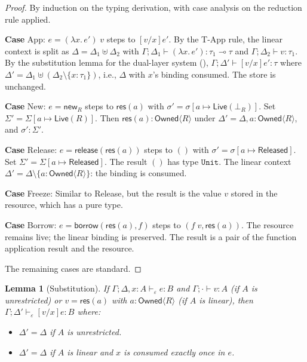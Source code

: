 \documentclass[11pt]{article}
\newtheorem{lemma}[theorem]{Lemma}
\newcommand{\Owned}[1]{\mathsf{Owned}\langle #1 \rangle}
\newcommand{\lolli}{\multimap}
\begin{document}
\begin{proof}
By induction on the typing derivation, with case analysis on the
reduction rule applied.

\textbf{Case} App: $e = (\lambda x.\, e')\; v$ steps to $[v/x]e'$.
By the T-App rule, the linear context is split as
$\Delta = \Delta_1 \uplus \Delta_2$ with
$\Gamma; \Delta_1 \vdash (\lambda x.\, e') : \tau_1 \lolli \tau$ and
$\Gamma; \Delta_2 \vdash v : \tau_1$.
By the substitution lemma for the dual-layer system (),
$\Gamma; \Delta' \vdash [v/x]e' : \tau$ where
$\Delta' = \Delta_1 \uplus (\Delta_2 \setminus \{x : \tau_1\})$,
i.e., $\Delta$ with $x$'s binding consumed.  The store is unchanged.

\textbf{Case} New: $e = \mathsf{new}_R$ steps to $\mathsf{res}(a)$
with $\sigma' = \sigma[a \mapsto \mathsf{Live}(\bot_R)]$.  Set
$\Sigma' = \Sigma[a \mapsto \mathsf{Live}(R)]$.  Then
$\mathsf{res}(a) : \Owned{R}$ under $\Delta' = \Delta, a : \Owned{R}$,
and $\sigma' : \Sigma'$.

\textbf{Case} Release: $e = \mathsf{release}(\mathsf{res}(a))$ steps
to $()$ with $\sigma' = \sigma[a \mapsto \mathsf{Released}]$.  Set
$\Sigma' = \Sigma[a \mapsto \mathsf{Released}]$.  The result $()$ has
type $\texttt{Unit}$.  The linear context $\Delta' = \Delta \setminus
\{a : \Owned{R}\}$: the binding is consumed.

\textbf{Case} Freeze: Similar to Release, but the result is the value
$v$ stored in the resource, which has a pure type.

\textbf{Case} Borrow: $e = \mathsf{borrow}(\mathsf{res}(a), f)$
steps to $(f\; v, \mathsf{res}(a))$.  The resource remains live; the
linear binding is preserved.  The result is a pair of the function
application result and the resource.

The remaining cases are standard.
\end{proof}

\begin{lemma}[Substitution]\label{lem:substitution}
If $\Gamma; \Delta, x : A \vdash_\varepsilon e : B$ and
$\Gamma; \cdot \vdash v : A$ (if $A$ is unrestricted) or
$v = \mathsf{res}(a)$ with $a : \Owned{R}$ (if $A$ is linear),
then $\Gamma; \Delta' \vdash_\varepsilon [v/x]e : B$ where:
\begin{itemize}
  \item $\Delta' = \Delta$ if $A$ is unrestricted.
  \item $\Delta' = \Delta$ if $A$ is linear and $x$ is consumed exactly
        once in $e$.
\end{itemize}
\end{lemma}
\end{document}
